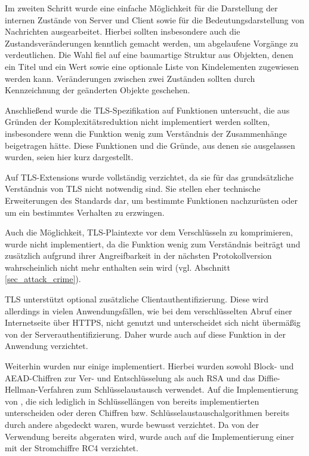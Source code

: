 Im zweiten Schritt wurde eine einfache Möglichkeit für die Darstellung der internen Zustände von Server und Client sowie für die Bedeutungsdarstellung von Nachrichten ausgearbeitet. Hierbei sollten insbesondere auch die Zustandsveränderungen kenntlich gemacht werden, um abgelaufene Vorgänge zu verdeutlichen. Die Wahl fiel auf eine baumartige Struktur aus Objekten, denen ein Titel und ein Wert sowie eine optionale Liste von Kindelementen zugewiesen werden kann. Veränderungen zwischen zwei Zuständen sollten durch Kennzeichnung der geänderten Objekte geschehen.


Anschließend wurde die TLS-Spezifikation auf Funktionen untersucht, die aus Gründen der Komplexitätsreduktion nicht implementiert werden sollten, insbesondere wenn die Funktion wenig zum Verständnis der Zusammenhänge beigetragen hätte. Diese Funktionen und die Gründe, aus denen sie ausgelassen wurden, seien hier kurz dargestellt.

Auf TLS-Extensions wurde vollständig verzichtet, da sie für das grundsätzliche Verständnis von TLS nicht notwendig sind. Sie stellen eher technische Erweiterungen des Standards dar, um bestimmte Funktionen nachzurüsten oder um ein bestimmtes Verhalten zu erzwingen.

Auch die Möglichkeit, TLS-Plaintexte vor dem Verschlüsseln zu komprimieren, wurde nicht implementiert, da die Funktion wenig zum Verständnis beiträgt und zusätzlich aufgrund ihrer Angreifbarkeit in der nächsten Protokollversion wahrscheinlich nicht mehr enthalten sein wird (vgl. Abschnitt \ref{sec_attack_crime}).

TLS unterstützt optional zusätzliche Clientauthentifizierung. Diese wird allerdings in vielen Anwendungsfällen, wie bei dem verschlüsselten Abruf einer Internetseite über HTTPS, nicht genutzt und unterscheidet sich nicht übermäßig von der Serverauthentifizierung. Daher wurde auch auf diese Funktion in der Anwendung verzichtet.

Weiterhin wurden nur einige \ciphersuites{} implementiert. Hierbei wurden sowohl Block- und AEAD-Chiffren zur Ver- und Entschlüsselung als auch RSA und das Diffie-Hellman-Verfahren zum Schlüsselaustausch verwendet. Auf die Implementierung von \ciphersuites{}, die sich lediglich in Schlüssellängen von bereits implementierten \ciphersuites{} unterscheiden oder deren Chiffren bzw. Schlüsselaustauschalgorithmen bereits durch andere \ciphersuites{} abgedeckt waren, wurde bewusst verzichtet. Da von der Verwendung bereits abgeraten wird, wurde auch auf die Implementierung einer \ciphersuite{} mit der Stromchiffre RC4 verzichtet.


